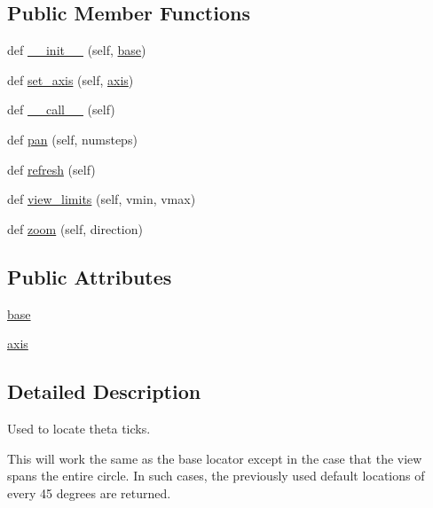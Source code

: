 \subsection*{Public Member Functions}
\begin{DoxyCompactItemize}
\item 
def \hyperlink{classmatplotlib_1_1projections_1_1polar_1_1ThetaLocator_a568bbdd8d2c992c09a104f0c2e28685d}{\+\_\+\+\_\+init\+\_\+\+\_\+} (self, \hyperlink{classmatplotlib_1_1projections_1_1polar_1_1ThetaLocator_adc5c8da0f90fd140394c459b7fbefe09}{base})
\item 
def \hyperlink{classmatplotlib_1_1projections_1_1polar_1_1ThetaLocator_a647b3852fe385e1868db26a6ed9cc838}{set\+\_\+axis} (self, \hyperlink{classmatplotlib_1_1projections_1_1polar_1_1ThetaLocator_a143152fa552b52a8961380a2ee5a2859}{axis})
\item 
def \hyperlink{classmatplotlib_1_1projections_1_1polar_1_1ThetaLocator_ad28c2e7271cf1d81d6540be240c72675}{\+\_\+\+\_\+call\+\_\+\+\_\+} (self)
\item 
def \hyperlink{classmatplotlib_1_1projections_1_1polar_1_1ThetaLocator_a9d5ce9cda19f875717b3dc3936ae8558}{pan} (self, numsteps)
\item 
def \hyperlink{classmatplotlib_1_1projections_1_1polar_1_1ThetaLocator_a61659c190caf74d74dab9443a108a5d0}{refresh} (self)
\item 
def \hyperlink{classmatplotlib_1_1projections_1_1polar_1_1ThetaLocator_a21b42118799a7722b3ff1ffc22339f1c}{view\+\_\+limits} (self, vmin, vmax)
\item 
def \hyperlink{classmatplotlib_1_1projections_1_1polar_1_1ThetaLocator_a31a3cfddab23a46a4389c0da1fb21500}{zoom} (self, direction)
\end{DoxyCompactItemize}
\subsection*{Public Attributes}
\begin{DoxyCompactItemize}
\item 
\hyperlink{classmatplotlib_1_1projections_1_1polar_1_1ThetaLocator_adc5c8da0f90fd140394c459b7fbefe09}{base}
\item 
\hyperlink{classmatplotlib_1_1projections_1_1polar_1_1ThetaLocator_a143152fa552b52a8961380a2ee5a2859}{axis}
\end{DoxyCompactItemize}


\subsection{Detailed Description}
\begin{DoxyVerb}Used to locate theta ticks.

This will work the same as the base locator except in the case that the
view spans the entire circle. In such cases, the previously used default
locations of every 45 degrees are returned.
\end{DoxyVerb}
 

